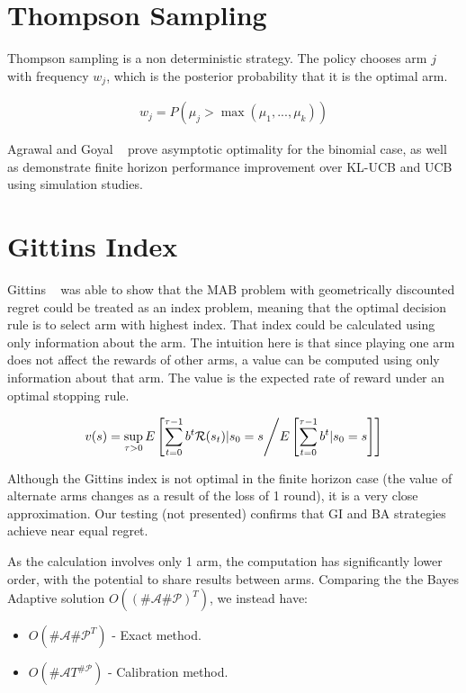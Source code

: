 \documentclass[11pt,a4,singlespacing,titlepagenumber=on]{scrreprt}
\numberwithin{equation}{chapter} %
\theoremstyle{remark}
\begin{document}
\section{ Thompson Sampling }

Thompson sampling is a non deterministic strategy. The policy chooses arm $j$ with frequency $w_j$, which is the posterior probability that it is the optimal arm.

\begin{align}
w_j = P(\mu_j > \max(\mu_1, ..., \mu_k))
\end{align}

Agrawal and Goyal ~\cite{DBLP:journals/corr/abs-1111-1797} prove asymptotic optimality for the binomial case, as well as demonstrate finite horizon performance improvement over KL-UCB and UCB using simulation studies.

\section{ Gittins Index }

Gittins ~\cite{gittins1979bandit} was able to show that the MAB problem with geometrically discounted regret could be treated as an index problem, meaning that the optimal decision rule is to select arm with highest index. That index could be calculated using only information about the arm. The intuition here is that since playing one arm does not affect the rewards of other arms, a value can be computed using only information about that arm. The value is the expected rate of reward under an optimal stopping rule.

\begin{align}
v(s) = \sup_{\tau > 0} E\left[ \sum_{t=0}^{\tau-1} b^t \mathcal{R}(s_t) | s_0 = s  \middle/  E\left[ \sum_{t=0}^{\tau-1} b^t | s_0 = s \right]  \right]
\end{align}

Although the Gittins index is not optimal in the finite horizon case (the value of alternate arms changes as a result of the loss of 1 round), it is a very close approximation. Our testing (not presented) confirms that GI and BA strategies achieve near equal regret.

As the calculation involves only 1 arm, the computation has significantly lower order, with the potential to share results between arms. Comparing the the Bayes Adaptive solution $O((\#\mathcal{A} \#\mathcal{P})^T)$, we instead have:

\begin{itemize}
	\item $O(\#\mathcal{A} {\#\mathcal{P}}^T)$ - Exact method.
	\item $O(\#\mathcal{A} T^{\#\mathcal{P}})$ - Calibration method.
\end{itemize}
\end{document}
